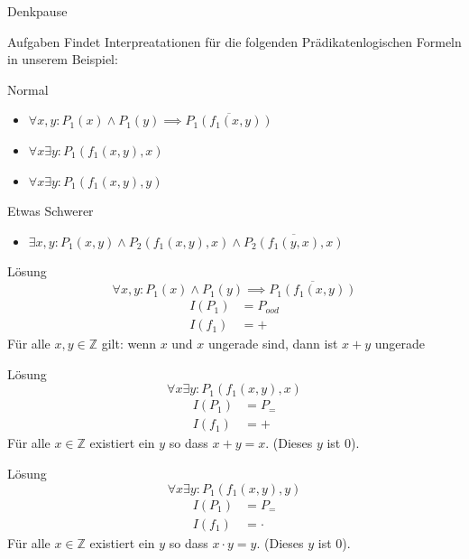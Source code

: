 {
\begin{frame}[fragile]{Denkpause}
	\footnotesize
	\begin{alertblock}{Aufgaben}
		Findet Interpreatationen für die folgenden Prädikatenlogischen Formeln in unserem Beispiel:
	\end{alertblock}
	\begin{block}{Normal}
		\begin{itemize}
			\item $\forall x,y : P_1(x) \wedge P_1(y) \implies \overline{P_1(f_1(x,y))}$
			\item $\forall x\exists y: P_1(f_1(x,y),x)$
			\item $\forall x\exists y: P_1(f_1(x,y),y)$
		\end{itemize}
	\end{block}
	\begin{block}{Etwas Schwerer}
		\begin{itemize}
			\item $\exists x,y: P_1(x,y) \wedge P_2(f_1(x,y),x) \wedge \overline{P_2(f_1(y,x),x)}$
		\end{itemize}
	\end{block}
\end{frame}

\begin{frame}{Lösung}
	$$\forall x,y : P_1(x) \wedge P_1(y) \implies \overline{P_1(f_1(x,y))}$$
	\begin{align*}
		I(P_1) & = P_{ood} \\
		I(f_1) & = +
	\end{align*}
	Für alle $x,y \in \mathbb Z$ gilt: wenn $x$ und $x$ ungerade sind, dann ist $x+y$ ungerade
\end{frame}

\begin{frame}{Lösung}
	$$\forall x\exists y: P_1(f_1(x,y),x)$$
	\begin{align*}
		I(P_1) & = P_{=} \\
		I(f_1) & = +
	\end{align*}
	Für alle $x \in \mathbb Z$ existiert ein $y$ so dass $x+y = x$. (Dieses $y$ ist $0$).
\end{frame}

\begin{frame}{Lösung}
	$$\forall x\exists y: P_1(f_1(x,y),y)$$
	\begin{align*}
		I(P_1) & = P_{=} \\
		I(f_1) & = \cdot
	\end{align*}
	Für alle $x \in \mathbb Z$ existiert ein $y$ so dass $x\cdot y = y$. (Dieses $y$ ist $0$).
\end{frame}

}
